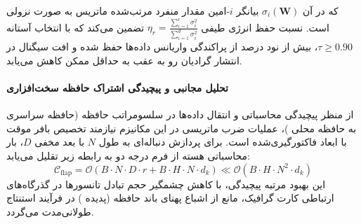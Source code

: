 که در آن $\sigma_i(\mathbf{W})$ بیانگر $i$-امین مقدار منفرد مرتب‌شده ماتریس به صورت نزولی است. نسبت حفظ انرژی طیفی $\eta_r = \frac{\sum_{i=1}^r \sigma_i^2}{\sum_{i=1}^{d} \sigma_i^2}$ تضمین می‌کند که با انتخاب آستانه $\tau \ge 0.90$، بیش از نود درصد از پراکندگی واریانس داده‌ها حفظ شده و افت سیگنال در انتشار گرادیان رو به عقب به حداقل ممکن کاهش می‌یابد.

\paragraph{تحلیل مجانبی و پیچیدگی اشتراک حافظه سخت‌افزاری}
از منظر پیچیدگی محاسباتی و انتقال داده‌ها در سلسومراتب حافظه (حافظه سراسری  به حافظه محلی )، عملیات ضرب ماتریسی در این مکانیزم نیازمند تخصیص بافر موقت با ابعاد فاکتورگیری‌شده است. برای پردازش دنباله‌ای به طول $N$ با بعد مخفی $D$، بار محاسباتی هسته از فرم درجه دو به رابطه زیر تقلیل می‌یابد:
\begin{equation}
\label{eq:complexity_flap}
\mathcal{C}_{\text{flap}} = \mathcal{O}\left( B \cdot N \cdot D \cdot r + B \cdot H \cdot N \cdot d_k \right) \ll \mathcal{O}\left( B \cdot H \cdot N^2 \cdot d_k \right)
\end{equation}
این بهبود مرتبه پیچیدگی، با کاهش چشمگیر حجم تبادل تانسورها در گذرگاه‌های ارتباطی کارت گرافیک، مانع از اشباع پهنای باند حافظه (پدیده ) در فرآیند استنتاج طولانی‌مدت می‌گردد.

